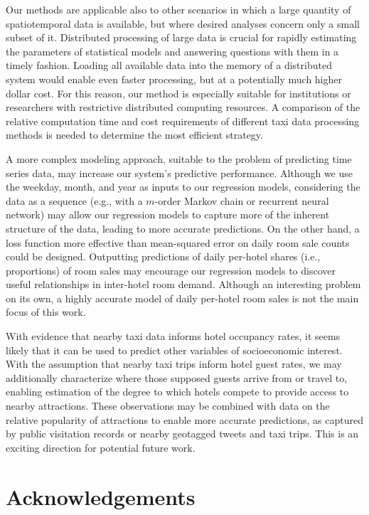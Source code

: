 \documentclass[useAMS, usenatbib]{biom}
\begin{document}
Our methods are applicable also to other scenarios in which a large quantity of spatiotemporal data is available, but where desired analyses concern only a small subset of it. Distributed processing of large data is crucial for rapidly estimating the parameters of statistical models and answering questions with them in a timely fashion. Loading all available data into the memory of a distributed system would enable even faster processing, but at a potentially much higher dollar cost. For this reason, our method is especially suitable for institutions or researchers with restrictive distributed computing resources. A comparison of the relative computation time and cost requirements of different taxi data processing methods is needed to determine the most efficient strategy.

A more complex modeling approach, suitable to the problem of predicting time series data, may increase our system's predictive performance. Although we use the weekday, month, and year as inputs to our regression models, considering the data as a sequence (e.g., with a $m$-order Markov chain or recurrent neural network) may allow our regression models to capture more of the inherent structure of the data, leading to more accurate predictions. On the other hand, a loss function more effective than mean-squared error on daily room sale counts could be designed. Outputting predictions of daily per-hotel shares (i.e., proportions) of room sales may encourage our regression models to discover useful relationships in inter-hotel room demand. Although an interesting problem on its own, a highly accurate model of daily per-hotel room sales is not the main focus of this work.

With evidence that nearby taxi data informs hotel occupancy rates, it seems likely that it can be used to predict other variables of socioeconomic interest. With the assumption that nearby taxi trips inform hotel guest rates, we may additionally characterize where those supposed guests arrive from or travel to, enabling estimation of the degree to which hotels compete to provide access to nearby attractions. These observations may be combined with data on the relative popularity of attractions to enable more accurate predictions, as captured by public visitation records or nearby geotagged tweets and taxi trips. This is an exciting direction for potential future work.

\backmatter

\section*{Acknowledgements}
\end{document}
